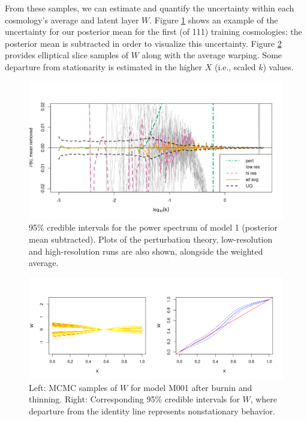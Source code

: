 \documentclass[11pt]{article}
\begin{document}
From these samples, we can estimate and quantify the uncertainty within each cosmology's average and latent layer $W$. Figure \ref{fig:plot_fit} shows an example of the uncertainty for our posterior mean for the first (of 111) training cosmologies; the posterior mean is subtracted in order to visualize this uncertainty. Figure \ref{fig:plot_warp} provides elliptical slice samples of $W$ along with the average warping. Some departure from stationarity is estimated in the higher $X$ (i.e., scaled $k$) values.

\begin{figure}[ht]
    \centering
    \includegraphics[width=6in]{plot_fit.png}
    \caption{95\% credible intervals for the power spectrum of model 1 (posterior mean subtracted). Plots of the perturbation theory, low-resolution and high-resolution runs are also shown, alongside the weighted average.}
    \label{fig:plot_fit}
\end{figure}

\begin{figure}[ht]
   \centering
   \includegraphics[width=6in]{plot_warp_M001.png}
   \caption{Left: MCMC samples of $W$ for model M001 after burnin and thinning. Right: Corresponding 95\% credible intervals for $W$, where departure from the identity line represents nonstationary behavior.}
   \label{fig:plot_warp}
\end{figure}
\end{document}
